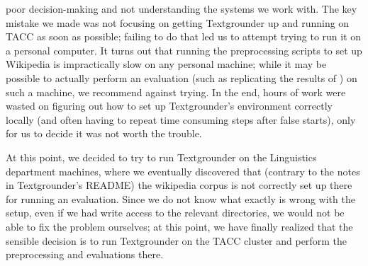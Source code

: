 poor decision-making and not understanding the systems we work with.
The key mistake we made was not focusing on getting Textgrounder up and running
on TACC as soon as possible; failing to do that led us to
attempt trying to run it on a personal computer.
It turns out that running the preprocessing scripts to set up Wikipedia is
impractically slow on any personal machine; while it may be possible to actually
perform an evaluation (such as replicating the results of \cite{rolleretal:12})
on such a machine, we recommend against trying.
In the end, hours of work were wasted on figuring out how to set up
Textgrounder's environment correctly locally (and often having to repeat time consuming
steps after false starts), only for us to decide it was not worth the trouble.
\par
At this point, we decided to try to run Textgrounder on the Linguistics
department machines, where we eventually discovered that (contrary to the notes
in Textgrounder's README) the wikipedia corpus is not correctly set up
there for running an evaluation.
Since we do not know what exactly is wrong with the setup, even if we had write
access to the relevant directories, we would not be able to fix the problem
ourselves; at this point, we have finally realized that the sensible decision
is to run Textgrounder on the TACC cluster and perform the preprocessing and evaluations there.

